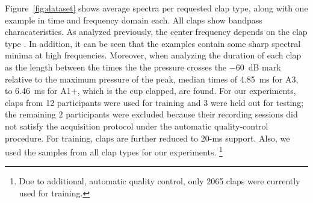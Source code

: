 \documentclass{article}
\newcommand{\shih}[1]{\textcolor{red}{S: #1}}
\begin{document}
Figure~\ref{fig:dataset} shows average spectra per requested clap type, along with one example in time and frequency domain each. All claps show bandpass characateristics. As analyzed previously, the center frequency depends on the clap type \cite{peltola2007synthesis}. In addition, it can be seen that the examples contain some sharp spectral minima at high frequencies. Moreover, when analyzing the duration of each clap as the length between the times the the pressure crosses the $-60$~dB mark relative to the maximum pressure of the peak, median times of 4.85~ms for A3, to 6.46~ms for A1+, which is the cup clapped, are found.
For our experiments, claps from 12 participants were used for training and
3 were held out for testing; the remaining 2 participants were excluded
because their recording sessions did not satisfy the acquisition protocol
under the automatic quality-control procedure. For training, claps are further reduced to 20-ms support. Also, we used the samples from all clap types for our experiments. \footnote{Due to additional, automatic quality control, only 2065 claps were currently used for training.}



\end{document}
